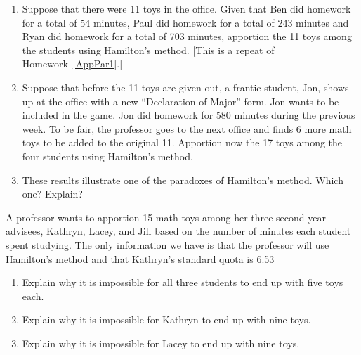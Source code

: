 \begin{Denumerate}
	\hwnewpage
\item \begin{enumerate}
	\item Suppose that there were 11 toys in the office.  Given that Ben did homework for a total of 54 minutes, Paul did homework for a total of 243 minutes and Ryan did homework for a total of 703 minutes, apportion the 11 toys among the students using Hamilton's method.  [This is a repeat of Homework~\ref{AppPar1}.] 
	\vfill 
	\item Suppose that before the 11 toys are given out, a frantic student, Jon, shows up at the office with a new ``Declaration of Major'' form.  Jon wants to be included in the game.  Jon did homework for 580 minutes during the previous week.  To be fair, the professor goes to the next office and finds 6 more math toys to be added to the original 11.  Apportion now the 17 toys among the four students using Hamilton's method. \vfill
		\item These results illustrate one of the paradoxes of Hamilton's method.  Which one?  Explain? 
	\vfill
	\end{enumerate}
	\hwnewpage
	
	\item A professor wants to apportion 15 math toys among her three second-year advisees, Kathryn, Lacey, and Jill based on the number of minutes each student spent studying.  The only information we have is that the professor will use Hamilton's method and that Kathryn's standard quota is 6.53
	\begin{enumerate}
		\item Explain why it is impossible for all three students to end up with five toys each.  \vfill
		\item Explain why it is impossible for Kathryn to end up with nine toys.  \vfill
		\item Explain why it is impossible for Lacey to end up with nine toys.  \vfill
\end{enumerate}
\end{Denumerate} \ENDHOMEWORK

\clearpage